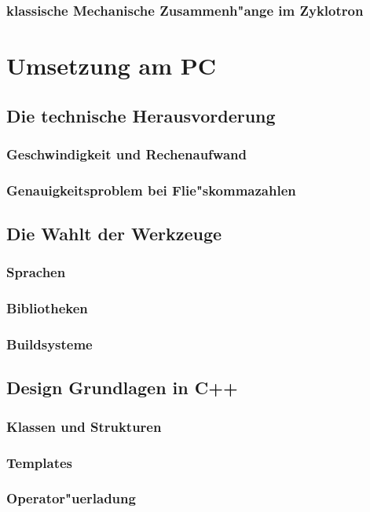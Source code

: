 \documentclass[14pt, a4paper]{report}
\begin{document}
\section{klassische Mechanische Zusammenh"ange im Zyklotron}





\part{Umsetzung am PC}
\chapter{Die technische Herausvorderung}
\section{Geschwindigkeit und Rechenaufwand}
\section{Genauigkeitsproblem bei Flie"skommazahlen}

\chapter{Die Wahlt der Werkzeuge}
\section{Sprachen}
\section{Bibliotheken}
\section{Buildsysteme}

\chapter{Design Grundlagen in C++}
\section{Klassen und Strukturen}
\section{Templates}
\section{Operator"uerladung}
\end{document}
